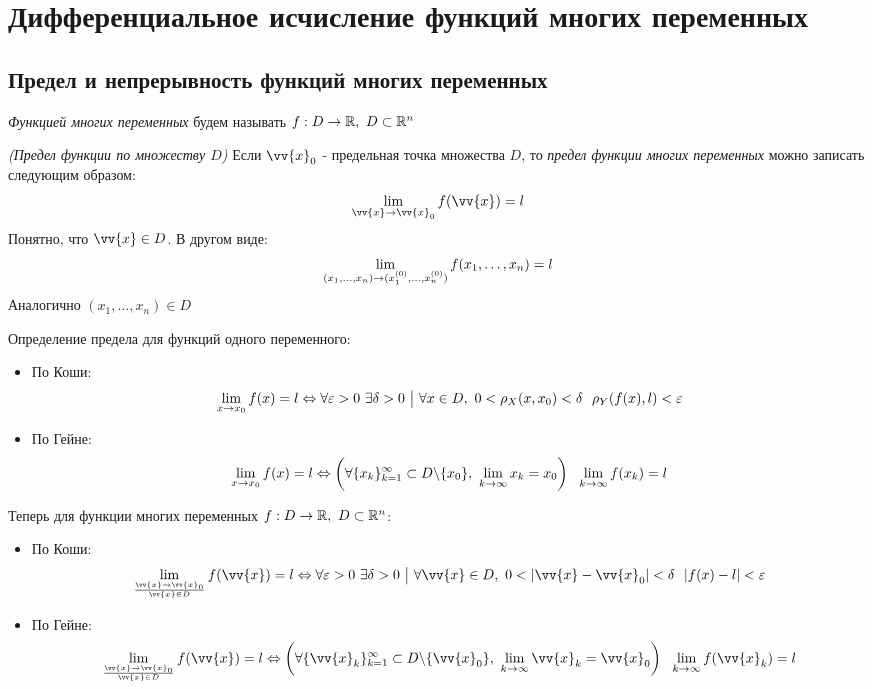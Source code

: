 
\section{Дифференциальное исчисление функций многих переменных}

\subsection{Предел и непрерывность функций многих переменных}

\begin{definition}
	\textit{Функцией многих переменных} будем называть $f: D \to \mathbb{R},\ D \subset \mathbb{R}^n$
\end{definition}

\begin{definition}
	\textit{(Предел функции по множеству $D$)} Если $\vv{x}_0$ - предельная точка множества $D$, то \textit{предел функции многих переменных} можно записать следующим образом:
	\[
		\liml_{\vv{x} \to \vv{x}_0} f(\vv{x}) = l
	\]
	Понятно, что $\vv{x} \in D$. В другом виде:
	\[
		\lim\limits_{(x_1, \ldots, x_n) \to (x_1^{(0)}, \ldots, x_n^{(0)})} f(x_1, \ldots, x_n) = l
	\]
	Аналогично $(x_1, \ldots, x_n) \in D$ 
	
	Определение предела для функций одного переменного:
	\begin{itemize}
		\item По Коши:
		\[
			\liml_{x \to x_0} f(x) = l \lra \forall \eps > 0\ \exists \delta > 0 \such \forall x \in D,\ 0 < \rho_X (x, x_0) < \delta\ \ \rho_Y(f(x), l) < \eps
		\]
		
		\item По Гейне:
		\[
			\liml_{x \to x_0} f(x) = l \lra \left(\forall \{x_k\}_{k = 1}^\infty \subset D \bs \{x_0\},\ \liml_{k \to \infty} x_k = x_0\right)\ \ \liml_{k \to \infty} f(x_k) = l
		\]
	\end{itemize}
	Теперь для функции многих переменных $f: D \to \mathbb{R},\ D \subset \mathbb{R}^n$:
	\begin{itemize}
		\item По Коши:
		\[
			\liml_{\vv{x} \to \vv{x}_0 \over \vv{x} \in D} f(\vv{x}) = l \lra \forall \eps > 0\ \exists \delta > 0 \such \forall \vv{x} \in D,\ 0 < |\vv{x} - \vv{x}_0| < \delta\ \ |f(x) - l| < \eps
		\]
		
		\item По Гейне:
		\[
			\liml_{\vv{x} \to \vv{x}_0 \over \vv{x} \in D} f(\vv{x}) = l \lra \left(\forall \{\vv{x}_k\}_{k = 1}^\infty \subset D \bs \{\vv{x}_0\},\ \liml_{k \to \infty} \vv{x}_k = \vv{x}_0\right)\ \ \liml_{k \to \infty} f(\vv{x}_k) = l
		\]
	\end{itemize}
\end{definition}

